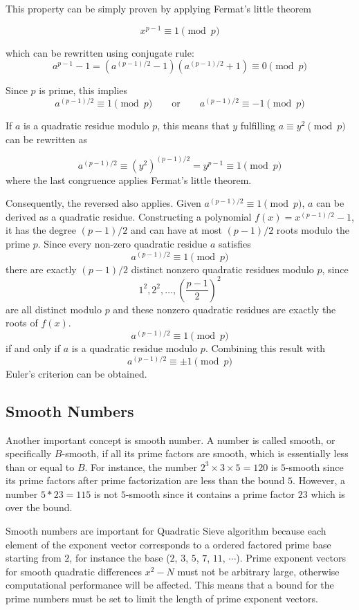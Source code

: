 \documentclass[11pt,a4paper]{article}
\begin{document}
This property can be simply proven by applying Fermat's little theorem

\[
x^{p-1} \equiv 1 \pmod p
\]

which can be rewritten using conjugate rule:
\[
a^{p-1} - 1 = (a^{(p-1)/2} - 1)(a^{(p-1)/2} + 1) \equiv 0 \pmod p
\]

Since $p$ is prime, this implies
\[
a^{(p-1)/2} \equiv 1 \pmod p
\qquad\text{or}\qquad
a^{(p-1)/2} \equiv -1 \pmod p
\]

If $a$ is a quadratic residue modulo $p$, this means that $y$ fulfilling $a \equiv y^2 \pmod p$ can be rewritten as

\[
a^{(p-1)/2}
\equiv
(y^2)^{(p-1)/2}
=
y^{p-1}
\equiv 1 \pmod p
\]
where the last congruence applies Fermat's little theorem.

Consequently, the reversed also applies. Given $a^{(p-1)/2} \equiv 1\pmod p$, $a$ can be derived as a quadratic residue. Constructing a polynomial $f(x)=x^{(p-1)/2}-1$, it has the degree $(p-1)/2$ and can have at most $(p-1)/2$ roots modulo the prime $p$. Since every non-zero quadratic residue  $a$ satisfies
\[
a^{(p-1)/2}\equiv 1\pmod p
\]
there are exactly $(p-1)/2$ distinct nonzero quadratic residues modulo $p$, since
\[
1^2,2^2,\ldots,\left(\frac{p-1}{2}\right)^2
\]
are all distinct modulo $p$ and these nonzero quadratic residues are exactly the roots of $f(x)$.
\[
a^{(p-1)/2}\equiv 1\pmod p
\]
if and only if $a$ is a quadratic residue modulo $p$.
Combining this result with
\[
a^{(p-1)/2}\equiv \pm1\pmod p
\]
Euler's criterion can be obtained.


\subsection*{Smooth Numbers}

Another important concept is smooth number. A number is called smooth, or specifically $B$-smooth, if all its prime factors are smooth, which is essentially less than or equal to $B$. For instance, the number $2^3\times 3 \times 5 = 120$ is $5$-smooth since its prime factors after prime factorization are less than the bound $5$. However, a number $5 * 23 = 115$ is not $5$-smooth since it contains a prime factor $23$ which is over the bound.

Smooth numbers are important for Quadratic Sieve algorithm because each element of the exponent vector corresponds to a ordered factored prime base starting from $2$, for instance the base ($2$, $3$, $5$, $7$, $11$, $\cdots$). Prime exponent vectors for smooth quadratic differences $x^2 - N$ must not be arbitrary large, otherwise computational performance will be affected. This means that a bound for the prime numbers must be set to limit the length of prime exponent vectors.
\end{document}
